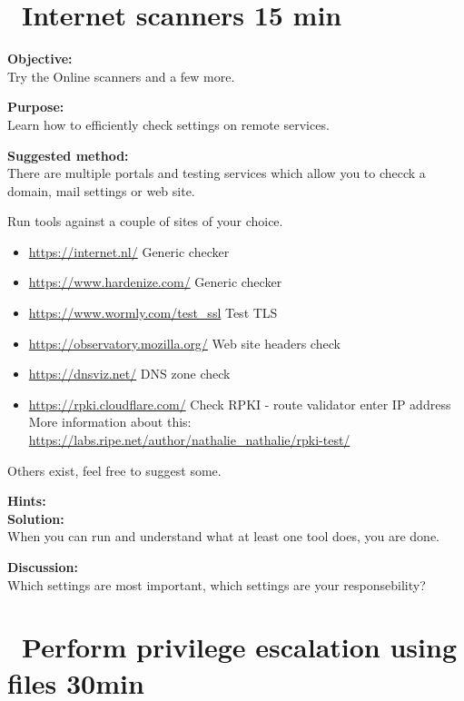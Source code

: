 \documentclass[a4paper,11pt,notitlepage]{report}
\begin{document}
\chapter{\faExclamationTriangle\ Internet scanners 15 min}
\label{ex:web-site-check}

{\bf Objective:}\\
Try the Online scanners  and a few more.

{\bf Purpose:}\\
Learn how to efficiently check settings on remote services.

{\bf Suggested method:}\\
There are multiple portals and testing services which allow you to checck a domain,
mail settings or web site.

Run tools against a couple of sites of your choice.
\begin{itemize}
\item \url{https://internet.nl/} Generic checker
\item \url{https://www.hardenize.com/} Generic checker
\item \url{https://www.wormly.com/test_ssl} Test TLS
\item \url{https://observatory.mozilla.org/} Web site headers check
\item \url{https://dnsviz.net/} DNS zone check
\item \url{https://rpki.cloudflare.com/} Check RPKI - route validator enter
IP address\\
More information about this: \url{https://labs.ripe.net/author/nathalie_nathalie/rpki-test/}
\end{itemize}

Others exist, feel free to suggest some.

{\bf Hints:}\\

{\bf Solution:}\\
When you can run and understand what at least one tool does, you are done.

{\bf Discussion:}\\
Which settings are most important, which settings are your responsebility?





\chapter{\faExclamationTriangle\ Perform privilege escalation using files 30min}
\label{ex:priv-esc-cron}
\end{document}
